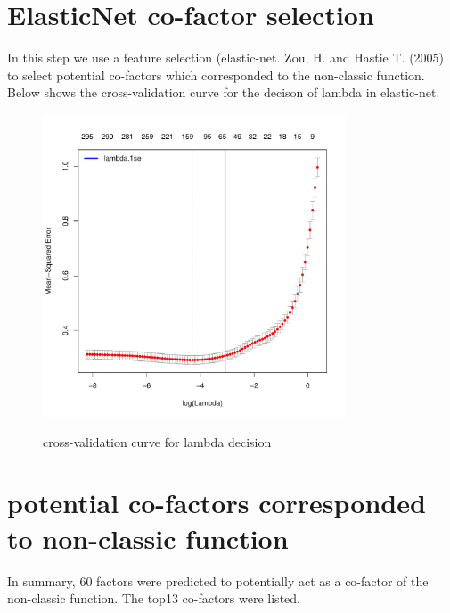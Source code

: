 \documentclass[11pt,a4paper]{article}
\begin{document}
\section{ElasticNet co-factor selection}
In this step we use a feature selection (elastic-net. Zou, H. and Hastie T. (2005) to select potential co-factors which corresponded to the non-classic function. Below shows the cross-validation curve for the decison of lambda in elastic-net.  
\begin{figure}[h]
        \caption{cross-validation curve for lambda decision} \label{fig:profileunion}
        \setlength{\abovecaptionskip}{0pt}
        \setlength{\belowcaptionskip}{10pt}
        \centering
        {\includegraphics[width=0.8\textwidth]{test3_elnet_lambdaSelection.pdf}}
\end{figure}

\newpage
\newpage
\section{potential co-factors corresponded to non-classic function}
In summary, 60 factors were predicted to potentially act as a co-factor of the non-classic function. The top13 co-factors were listed.
\end{document}
